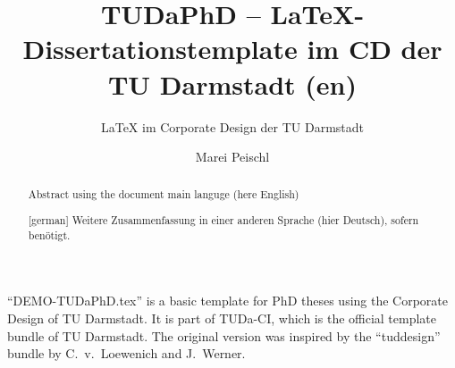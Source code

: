 \documentclass[
	english,%
	accentcolor=9c,%
	ruledheaders=chapter,%
	class=book,%
	thesis={%
		type=dr,
		dr=rernat
	},
	fontsize=11pt,%
	parskip=half-,%
	custommargins=true,%
	marginpar=false,%
]{tudapub}
\title{TUDaPhD -- \LaTeX-Dissertationstemplate im CD der TU Darmstadt (en)}
\subtitle{\LaTeX{} im Corporate Design der TU Darmstadt}
\author{Marei Peischl}
\institute{Institute}
\begin{document}
\frontmatter

\maketitle

\affidavit%
\begin{abstract}
	Abstract using the document main languge (here English)
\end{abstract}

\begin{abstract}[german]
	Weitere Zusammenfassung in einer anderen Sprache (hier Deutsch), sofern benötigt.
\end{abstract}

\tableofcontents

\mainmatter


\enquote{DEMO-TUDaPhD.tex} is a basic template for PhD theses using the Corporate Design of TU Darmstadt.
It is part of TUDa-CI, which is the official template bundle of TU Darmstadt. The original version was inspired by the \enquote{tuddesign} bundle by C.~v.~Loewenich and J.~Werner.


\printbibliography
\end{document}

